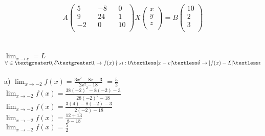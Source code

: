 \documentclass{report}%
\begin{document}
{
{\small
\begin{align}
A
\begin{pmatrix}%
  {5} && {-8} && {0}\\
   {9} && {24} && {1}\\
    {-2} && {0} && {10}\\
\end{pmatrix}  
X
\begin{pmatrix}%
  {x}\\
    {y}\\
   {z}\\
\end{pmatrix}
= B
\begin{pmatrix}%
  {10}\\
    {2}\\
    {3}\\
\end{pmatrix}
\end{align}
}\\
\\
{\small  
$ \displaystyle{\lim_{x\rightarrow c} = L}$\\
$\forall \in \textgreater 0, \delta\textgreater 0,   \rightarrow  f(x)  \dagger si:\\
 0 \textless |x-c| \textless \delta \rightarrow |f(x)- L|\textless \epsilon $} \\
\\
{\small
a)
$\displaystyle{\lim_{ x \rightarrow -2}} f(x)= \displaystyle \frac{3x^2-8x-3}{2x^2 -18}$ $=\displaystyle{\frac{5}{2}}$\\

$\displaystyle{\lim_{ x \rightarrow -2}} f(x)= \displaystyle \frac{38(-2)^2-8(-2)-3}{ 28(-2)^2 -18}$\\

$\displaystyle{\lim_{ x \rightarrow -2}} f(x)= \displaystyle \frac{3(4)-8(-2)-3}{ 2(-2) -18}$\\

$\displaystyle{\lim_{ x \rightarrow -2}} f(x)= \displaystyle \frac{12+13}{8 -18} $\\

$\displaystyle{\lim_{ x \rightarrow -2}} f(x)= \displaystyle \frac{5}{2} $\\

}}
\end{document}
